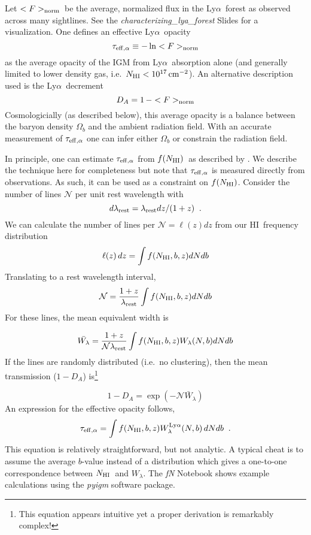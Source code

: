 \documentclass[graybox]{svmult}
\newcommand{\HI}{H{\sc I}}
\def\lya{Ly$\alpha$}
\newcommand{\mnhi}{N_{\rm HI}}
\newcommand{\nhi}{$\mnhi$}
\def\cm#1{\, {\rm cm^{#1}}}
\def\mfnhi{f(\mnhi)}
\def\fnhi{$\mfnhi$}
\def\mfnorm{<F>_{\rm norm}}
\def\fnorm{$\mfnorm$}
\begin{document}
Let \fnorm\ be the average, normalized flux in
the \lya\ forest as observed across many sightlines. 
See the {\it characterizing\_lya\_forest} Slides for 
a visualization.
One defines an effective \lya\ opacity
\begin{equation}
\tau_{\rm eff, \alpha} \equiv - \ln \mfnorm
\end{equation}
as the average opacity of the IGM from \lya\ absorption alone
(and generally limited to lower density gas, i.e.\ $\mnhi < 10^{17} \cm{-2}$).
An alternative description used is
the \lya\ decrement
\begin{equation}
D_A = 1 \, - \mfnorm
\end{equation}
Cosmologicially (as described below), this
average opacity is a balance between the baryon density 
$\Omega_b$ and the ambient radiation field.
With an accurate measurement of $\tau_{\rm eff,\alpha}$
one can infer either $\Omega_b$ or constrain the radiation
field. 

In principle, one can estimate $\tau_{\rm eff,\alpha}$
from \fnhi\ as described by
\cite{mj90,press93}. %
We describe the technique here for completeness but note
that $\tau_{\rm eff,\alpha}$ is measured directly from observations.
As such, it can be used as a constraint on \fnhi.
Consider the number of lines $\mathcal{N}$ per unit rest wavelength 
with
\begin{equation}
d\lambda_{\rm rest} = \lambda_{\rm rest} dz / (1+z) \;\; .
\end{equation}
We can calculate the number of lines per $\mathcal{N} = \ell(z) dz$
from  our \HI\ frequency distribution
\begin{equation}
\ell(z) \, dz = \int f(\mnhi,b,z) dN db
\end{equation}
Translating to a rest wavelength interval,
\begin{equation}
\mathcal{N} = \frac{1+z}{\lambda_{\rm rest}} \int f(\mnhi,b,z) dN db
\end{equation}
For these lines, the
mean equivalent width is

\begin{equation}
\bar{W_\lambda} = \frac{1+z}{\mathcal{N} \lambda_{\rm rest}} 
\int f(\mnhi,b,z) W_\lambda(N,b) dN db 
\end{equation}
If the lines are randomly distributed (i.e.\ no clustering),
then the mean transmission ($1-D_A$) is\footnote{
This equation appears intuitive yet a proper derivation 
is remarkably complex!}

\begin{equation}
1-D_A = \exp (-\mathcal{N} \bar W_\lambda)
\end{equation}
An expression for the effective opacity follows, 
\begin{equation}
\tau_{\rm eff, \alpha} = \int f(\mnhi,b,z) 
W^{\rm Ly\alpha}_\lambda(N,b) \, dN db  \;\; .
\label{eqn:teff}
\end{equation}
This equation is relatively straightforward, but
not analytic.
A typical cheat is to assume the average $b$-value instead
of a distribution which
gives a one-to-one correspondence between \nhi\ and $W_\lambda$.
The {\it fN} Notebook shows example calculations using
the {\it pyigm} software package.
\end{document}
